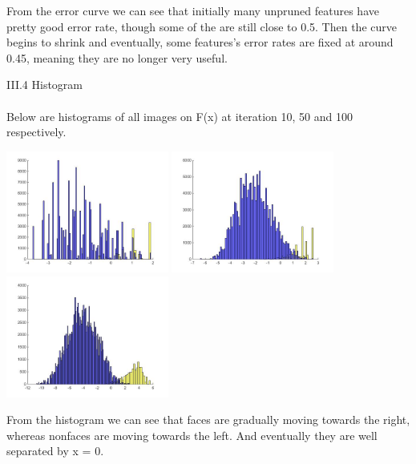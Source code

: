 \documentclass[12pt]{article}
\newenvironment{p2}[2][III Adaboost for Classifier Selection]{\begin{trivlist}
\item[\hskip \labelsep {\bfseries #1}\hskip \labelsep {\bfseries #2}]}{\end{trivlist}}
\begin{document}
\begin{p2}{}
\begin{center}
\end{center}
From the error curve we can see that initially many unpruned features have pretty good error rate, though some of the are still close to 0.5. Then the curve begins to shrink and eventually, some features's error rates are fixed at around 0.45, meaning they are no longer very useful.

\item{III.4 Histogram\\\\}
Below are histograms of all images on F(x) at iteration 10, 50 and 100 respectively.
\begin{center}
		\includegraphics[height=4cm]{data/histogram_10.jpg}
		\includegraphics[height=4cm]{data/histogram_50.jpg}
		\includegraphics[height=4cm]{data/histogram_100.jpg}
\end{center}
From the histogram we can see that faces are gradually moving towards the right, whereas nonfaces are moving towards the left. And eventually they are well separated by x = 0.
\begin{center}

\end{center}
\end{p2}
\end{document}
